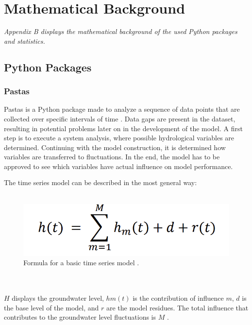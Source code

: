 \chapter{Mathematical Background}
\label{appendix: B}

\emph{Appendix B displays the mathematical background of the used Python packages and statistics.}

\section{Python Packages}

\subsection{Pastas}
Pastas is a Python package made to analyze a sequence of data points that are collected over specific intervals of time \cite{collenteur-2019}. Data gaps are present in the dataset, resulting in potential problems later on in the development of the model. A first step is to execute a system analysis, where possible hydrological variables are determined. Continuing with the model construction, it is determined how variables are transferred to fluctuations. In the end, the model has to be approved to see which variables have actual influence on model performance.

The time series model can be described in the most general way:\\
\\
\begin{figure}[htbp]
    \centering
    \includegraphics[width=0.5\linewidth]{appendix/basic model.png}
    \caption{Formula for a basic time series model \cite{asmuth-2021}.}
    \label{Pastas}
\end{figure}\\
\\
\(H\) displays the groundwater level, \(hm(t)\) is the contribution of influence \(m\), \(d\) is the base level of the model, and \(r\) are the model residues. The total influence that contributes to the groundwater level fluctuations is \(M\) \cite{asmuth-2021}. 


